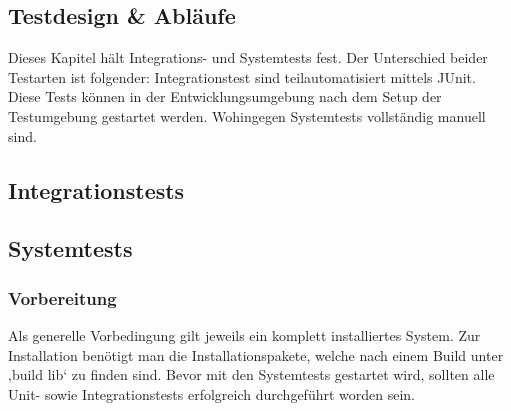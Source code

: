 \subsection{Testdesign \& Abläufe}
Dieses Kapitel hält Integrations- und Systemtests fest. Der Unterschied beider Testarten ist folgender: Integrationstest sind teilautomatisiert mittels JUnit. Diese Tests können in der Entwicklungsumgebung nach dem Setup der Testumgebung gestartet werden. Wohingegen Systemtests vollständig manuell sind.
\subsection{Integrationstests}









\subsection{Systemtests}
\subsubsection{Vorbereitung}
Als generelle Vorbedingung gilt jeweils ein komplett installiertes System. Zur Installation benötigt man die Installationspakete, welche nach einem Build unter ‚build lib‘ zu finden sind. Bevor mit den Systemtests gestartet wird, sollten alle Unit- sowie Integrationstests erfolgreich durchgeführt worden sein.


